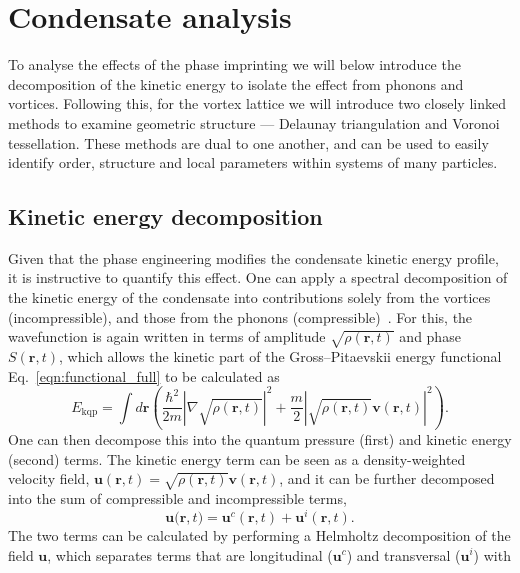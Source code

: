 \section{Condensate analysis}\label{sec:con_analysis}
To analyse the effects of the phase imprinting we will below introduce the decomposition of the kinetic energy to isolate the effect from phonons and vortices. Following this, for the vortex lattice we will introduce two closely linked methods to examine geometric structure --- Delaunay triangulation and Voronoi tessellation. These methods are dual to one another, and can be used to easily identify order, structure and local parameters within systems of many particles.

\subsection{Kinetic energy decomposition}\label{sec:kinspec}
Given that the phase engineering modifies the condensate kinetic energy profile, it is instructive to quantify this effect. One can apply a spectral decomposition of the kinetic energy of the condensate into contributions solely from the vortices (incompressible), and those from the phonons (compressible)~\cite{CT:Nore_prl_1997,CT:Nore_pof_1997,CT:Bradley_prx_2012}. For this, the wavefunction is again written in terms of amplitude $\sqrt{\rho(\mathbf{r},t)}$ and phase $S(\mathbf{r},t)$, which allows the kinetic part of the Gross--Pitaevskii energy functional Eq.~\eqref{eqn:functional_full} to be calculated as
\begin{equation}
    E_{\text{kqp}} = \int d\mathbf{r} \left( \frac{\hbar^2}{2m}| \nabla\sqrt{\rho(\mathbf{r},t)} |^2  + \frac{m}{2}|\sqrt{\rho(\mathbf{r},t)}\mathbf{v}(\mathbf{r},t) |^2\right).
\end{equation}
One can then decompose this into the quantum pressure (first) and kinetic energy (second) terms. The kinetic energy term can be seen as a density-weighted velocity field, $\mathbf{u}(\mathbf{r},t) = \sqrt{\rho(\mathbf{r},t)}\mathbf{v}(\mathbf{r},t)$, and it can be further decomposed into the sum of compressible and incompressible terms,
\begin{equation}\label{eqn:kin_en}
    \mathbf{u(r},t) = \mathbf{u}^c(\mathbf{r},t) + \mathbf{u}^i(\mathbf{r},t).
\end{equation}
The two terms can be calculated by performing a Helmholtz decomposition of the field $\mathbf{u}$, which separates terms that are longitudinal ($\mathbf{u}^c$) and transversal ($\mathbf{u}^i$) with
